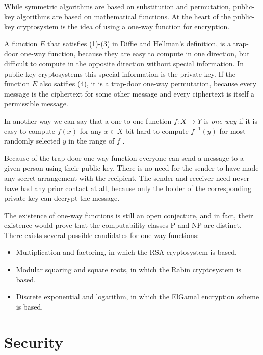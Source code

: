 \documentclass[english,titlepage,11pt]{article}
\begin{document}
While symmetric algorithms are based on substitution and permutation, public-key algorithms are based on mathematical functions\cite{stallings06}. At the heart of the public-key cryptosystem is the idea of using a one-way function for encryption\cite{koblitz04}.

A function $E$ that satisfies (1)-(3) in Diffie and Hellman's definition, is a trap-door one-way function, because they are easy to compute in one direction, but difficult to compute in the opposite direction without special information. In public-key cryptosystems this special information is the private key. If the function $E$ also satifies (4), it is a trap-door one-way permutation, because every message is the ciphertext for some other message and every ciphertext is itself a permissible message\cite{rsa78}.

In another way we can say that a one-to-one function $f : X \rightarrow Y$ is \emph{one-way} if it is easy to compute $f(x)$ for any $x \in X$ bit hard to compute $f^{-1}(y)$ for most randomly selected $y$ in the range of $f$ \cite{koblitz04,menezes01}.

Because of the trap-door one-way function everyone can send a message to a given person using their public key. There is no need for the sender to have made any secret arrangement with the recipient. The sender and receiver need never have had any prior contact at all, because only the holder of the corresponding private key can decrypt the message\cite{diffie88,koblitz04}.

The existence of one-way functions is still an open conjecture, and in fact, their existence would prove that the computability classes P and NP are distinct\cite{goldreich01}. There exists several possible candidates for one-way functions:

\begin{itemize}
	\item Multiplication and factoring, in which the RSA cryptosystem is based\cite{rsa78,rivest03}.
	\item Modular squaring and square roots, in which the Rabin cryptosystem is based\cite{rabin79}.
	\item Discrete exponential and logarithm, in which the ElGamal encryption scheme is based\cite{elgamal85}.
\end{itemize}

\section{Security}
\end{document}
